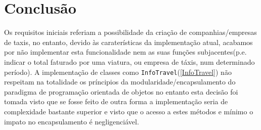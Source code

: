 \documentclass[a4paper,10pt,portuguese]{article}
\begin{document}
\newpage

\section{Conclusão}
Os requisitos iniciais referiam a possibilidade da criação de companhias/empresas de taxis, no entanto, devido às caraterísticas da implementação atual, acabamos por não implementar esta funcionalidade nem as suas funções subjacentes(p.e. indicar o total faturado por uma viatura, ou empresa de táxis, num determinado período). A implementação de classes como \texttt{InfoTravel}(\ref{InfoTravel}) não respeitam na totalidade os príncipios da modularidade/encapsulamento do paradigma de programação orientada de objetos no entanto esta decisão foi tomada visto que se fosse feito de outra forma a implementação seria de complexidade bastante superior e visto que o acesso a estes métodos e mínimo o impato no encapsulamento é negligenciável.
\end{document}
